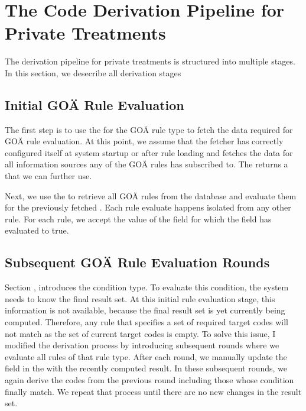 \section{The Code Derivation Pipeline for Private Treatments}\label{sec:the-code-derivation-pipeline-for-private-treatments}

The derivation pipeline for private treatments is structured into multiple stages.
In this section, we desecribe all derivation stages

\subsection{Initial GOÄ Rule Evaluation}\label{subsec:initial-goä-rule-evalutation}

The first step is to use the \REIF for the GOÄ rule type to fetch the data required for GOÄ rule evaluation.
At this point,
we assume that the fetcher has correctly configured itself at system startup or after rule loading
and fetches the data for all information sources any of the GOÄ rules has subscribed to.
The \REIF returns a \REI that we can further use.

Next, we use the  to retrieve all GOÄ rules from the database and evaluate them for the previously fetched \REI.
Each rule evaluate happens isolated from any other rule.
For each rule, we accept the value of the  field for which the  field has evaluated to true.

\subsection{Subsequent GOÄ Rule Evaluation Rounds}\label{subsec:susequent-goä-rule-evaluation-rounds}

Section \addref, introduces the  condition type.
To evaluate this condition, the system needs to know the final result set.
At this initial rule evaluation stage, this information is not available, because the final result set is yet currently being computed.
Therefore, any rule that specifies a set of required target codes will not match as the set of current target codes is empty.
To solve this issue,
I modified the derivation process by introducing subsequent rounds where we evaluate all rules of that rule type.
After each round, we manually update the  field in the \REI with the recently computed result.
In these subsequent rounds, we again derive the codes from the previous round including those whose  condition finally match.
We repeat that process until there are no new changes in the result set.

